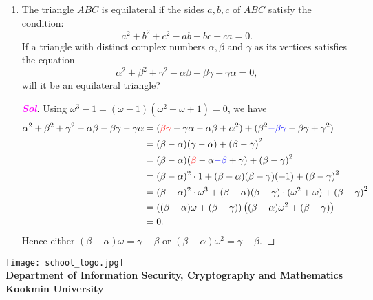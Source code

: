 \documentclass{article}
\newcommand{\footer}[1]{
\begin{flushright}
	\vspace{2em}
	\texttt{[image: school\_logo.jpg]} \\
	\vspace{1em}
	\textcolor{blue2}{\small\textbf{#1}}
\end{flushright}
}
\theoremstyle{definition}
\newcommand{\of}[1]{\left( #1 \right)}
\newcommand{\sol}{\textcolor{magenta}{\bf Sol}}
\begin{document}
\begin{enumerate}
\begin{proof}[\sol]
\begin{enumerate}
			$\frac{\partial u}{\partial x}(0, 0) = 0 = \frac{\partial v}{\partial y}(0, 0)$
			$\frac{\partial u}{\partial y}(0, 0) = 0 = -\frac{\partial v}{\partial x}(0, 0)$
			As the Cauchy-Riemann equations hold at $z = 0$, we can conclude that the function $f(z)$ is complex differentiable at $z = 0$.
		\end{enumerate}
	\end{proof}
	
	\item The triangle $ABC$ is equilateral if the sides $a, b, c$ of $ABC$ satisfy the condition: \[
	a^2 + b^2 + c^2 - ab - bc - ca = 0.
	\]
	If a triangle with distinct complex numbers $\alpha,\beta$ and $\gamma$ as its vertices satisfies the equation \[
	\alpha^2+\beta^2+\gamma^2-\alpha\beta-\beta\gamma-\gamma\alpha=0,
	\] will it be an equilateral triangle?
	\begin{proof}[\sol]
		Using $\omega^3-1=(\omega-1)\of{\omega^2+\omega+1}=0$, we have \begin{align*}
			\alpha^2+\beta^2+\gamma^2-\alpha\beta-\beta\gamma-\gamma\alpha&=(\textcolor{red}{\beta\gamma} - \gamma\alpha - \alpha\beta + \alpha^2) + (\beta^2\textcolor{blue}{-\beta\gamma} -\beta\gamma + \gamma^2)\\
			&=(\beta-\alpha)(\gamma-\alpha)+\of{\beta-\gamma}^2\\
			&=(\beta-\alpha)(\textcolor{red}{\beta}-\alpha\textcolor{blue}{-\beta}+\gamma)+\of{\beta-\gamma}^2\\
			&=(\beta-\alpha)^2\cdot 1+(\beta-\alpha)(\beta-\gamma)(-1)+\of{\beta-\gamma}^2\\
			&=(\beta-\alpha)^2\cdot\omega^3+(\beta-\alpha)(\beta-\gamma)\cdot(\omega^2+\omega)+\of{\beta-\gamma}^2\\
			&=\of{(\beta-\alpha)\omega+(\beta-\gamma)}\of{(\beta-\alpha)\omega^2+(\beta-\gamma)}\\
			&=0.
		\end{align*} Hence either $\of{\beta-\alpha}\omega=\gamma-\beta$ or $\of{\beta-\alpha}\omega^2=\gamma-\beta$.
	\end{proof}
\end{enumerate}


\footer{Department of Information Security, Cryptography and Mathematics\\ Kookmin University}
\end{document}
